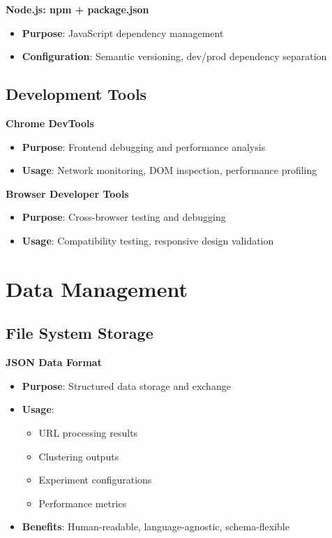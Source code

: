 \textbf{Node.js: npm + package.json}
\begin{itemize}
    \item \textbf{Purpose}: JavaScript dependency management
    \item \textbf{Configuration}: Semantic versioning, dev/prod dependency separation
\end{itemize}

\subsection{Development Tools}
\label{subsec:development-tools}

\textbf{Chrome DevTools}
\begin{itemize}
    \item \textbf{Purpose}: Frontend debugging and performance analysis
    \item \textbf{Usage}: Network monitoring, DOM inspection, performance profiling
\end{itemize}

\textbf{Browser Developer Tools}
\begin{itemize}
    \item \textbf{Purpose}: Cross-browser testing and debugging
    \item \textbf{Usage}: Compatibility testing, responsive design validation
\end{itemize}

\section{Data Management}
\label{sec:data-management}

\subsection{File System Storage}
\label{subsec:file-storage}

\textbf{JSON Data Format}
\begin{itemize}
    \item \textbf{Purpose}: Structured data storage and exchange
    \item \textbf{Usage}:
        \begin{itemize}
            \item URL processing results
            \item Clustering outputs
            \item Experiment configurations
            \item Performance metrics
        \end{itemize}
    \item \textbf{Benefits}: Human-readable, language-agnostic, schema-flexible
\end{itemize}

